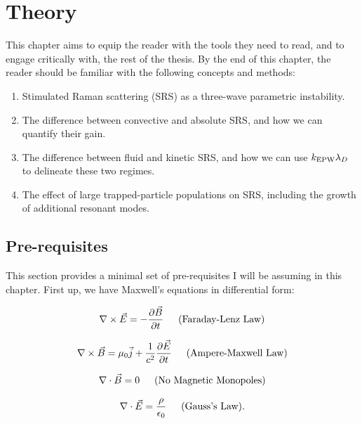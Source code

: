 \chapter{Theory}
\label{chp:theory}

This chapter aims to equip the reader with the tools they need to read, and to engage critically with, the rest of the thesis. By the end of this chapter, the reader should be familiar with the following concepts and methods:
\begin{enumerate}
	\item Stimulated Raman scattering (\acrshort{SRS}) as a three-wave parametric instability.
	\item The difference between convective and absolute SRS, and how we can quantify their gain.
	\item The difference between fluid and kinetic SRS, and how we can use $k_\mathrm{EPW}\lambda_D$ to delineate these two regimes.
	\item The effect of large trapped-particle populations on SRS, including the growth of additional resonant modes.
\end{enumerate}


\section{Pre-requisites}
This section provides a minimal set of pre-requisites I will be assuming in this chapter. First up, we have Maxwell's equations in differential form:



\begin{equation}
\nabla \times \vec{E}=-\frac{\partial \vec{B}}{\partial t} \text{\,\,\,\,\,\,\,\,\,(Faraday-Lenz Law)}
\end{equation}

\begin{equation}
\nabla \times \vec{B}=\mu_{0} \vec{j}+\frac{1}{c^{2}} \frac{\partial \vec{E}}{\partial t}
\text{\,\,\,\,\,\,\,\,\,(Ampere-Maxwell Law)}
\end{equation}

\begin{equation}
\nabla \cdot \vec{B}=0 \text{\,\,\,\,\,\,\,\,\,(No Magnetic Monopoles)}
\end{equation}

\begin{equation}
\nabla \cdot \vec{E}=\frac{\rho}{\epsilon_{0}} \text{\,\,\,\,\,\,\,\,\,(Gauss's Law)}.
\end{equation}


